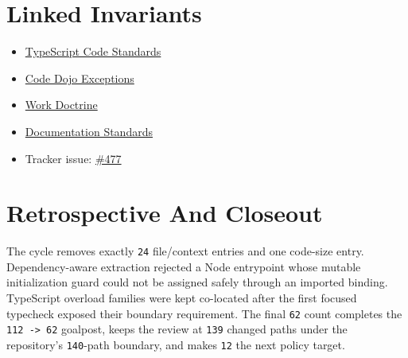 \section{Linked Invariants}\label{record-246-linked-invariants}

\begin{itemize}
\tightlist
\item
  \href{https://github.com/flyingrobots/bijou/blob/cbd70612140e7a450d764b3c7be1c6af878b99bc/docs/typescript-code-standards.editors-edition.md}{TypeScript Code Standards}
\item
  \href{https://github.com/flyingrobots/bijou/blob/cbd70612140e7a450d764b3c7be1c6af878b99bc/docs/code-dojo-exceptions.md}{Code Dojo Exceptions}
\item
  \href{https://github.com/flyingrobots/bijou/blob/5b10cb89165b76673ffc60da59d7de5a531e55e9/docs/METHOD.md}{Work Doctrine}
\item
  \href{https://github.com/flyingrobots/bijou/blob/cbd70612140e7a450d764b3c7be1c6af878b99bc/docs/DOCUMENTATION_STANDARDS.md}{Documentation Standards}
\item
  Tracker issue: \href{https://github.com/flyingrobots/bijou/issues/477}{\#477}
\end{itemize}

\section{Retrospective And Closeout}\label{record-246-retrospective-and-closeout}

The cycle removes exactly \texttt{2\allowbreak{}4} file/context entries and one code-size entry. Dependency-aware extraction rejected a Node entrypoint whose mutable initialization guard could not be assigned safely through an imported binding. TypeScript overload families were kept co-located after the first focused typecheck exposed their boundary requirement. The final \texttt{6\allowbreak{}2} count completes the \texttt{1\allowbreak{}1\allowbreak{}2\allowbreak{} \allowbreak{}-\allowbreak{}>\allowbreak{} \allowbreak{}6\allowbreak{}2} goalpost, keeps the review at \texttt{1\allowbreak{}3\allowbreak{}9} changed paths under the repository's \texttt{1\allowbreak{}4\allowbreak{}0}-path boundary, and makes \texttt{1\allowbreak{}2} the next policy target.

